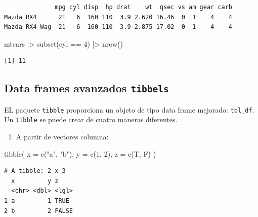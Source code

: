 \documentclass[
  letterpaper,
  DIV=11,
  numbers=noendperiod]{scrreprt}
\newenvironment{Shaded}{\begin{snugshade}}{\end{snugshade}}
\newcommand{\AttributeTok}[1]{\textcolor[rgb]{0.40,0.45,0.13}{#1}}
\newcommand{\DecValTok}[1]{\textcolor[rgb]{0.68,0.00,0.00}{#1}}
\newcommand{\FunctionTok}[1]{\textcolor[rgb]{0.28,0.35,0.67}{#1}}
\newcommand{\NormalTok}[1]{\textcolor[rgb]{0.00,0.23,0.31}{#1}}
\newcommand{\SpecialCharTok}[1]{\textcolor[rgb]{0.37,0.37,0.37}{#1}}
\newcommand{\StringTok}[1]{\textcolor[rgb]{0.13,0.47,0.30}{#1}}
\providecommand{\tightlist}{%
  \setlength{\itemsep}{0pt}\setlength{\parskip}{0pt}}\usepackage{longtable,booktabs,array}
\begin{document}
\begin{verbatim}
              mpg cyl disp  hp drat    wt  qsec vs am gear carb
Mazda RX4      21   6  160 110  3.9 2.620 16.46  0  1    4    4
Mazda RX4 Wag  21   6  160 110  3.9 2.875 17.02  0  1    4    4
\end{verbatim}

\begin{Shaded}
\begin{Highlighting}[]
\NormalTok{mtcars }\SpecialCharTok{|\textgreater{}} \FunctionTok{subset}\NormalTok{(cyl }\SpecialCharTok{==} \DecValTok{4}\NormalTok{) }\SpecialCharTok{|\textgreater{}} \FunctionTok{nrow}\NormalTok{()  }
\end{Highlighting}
\end{Shaded}

\begin{verbatim}
[1] 11
\end{verbatim}

\subsection{\texorpdfstring{Data frames avanzados
\texttt{tibbels}}{Data frames avanzados tibbels}}\label{data-frames-avanzados-tibbels}

EL paquete \texttt{tibble} proporciona un objeto de tipo data frame
mejorado: \texttt{tbl\_df}. Un \texttt{tibble} se puede crear de cuatro
maneras diferentes.

\begin{enumerate}
\def\labelenumi{\alph{enumi}.}
\tightlist
\item
  A partir de vectores columna:
\end{enumerate}

\begin{Shaded}
\begin{Highlighting}[]
\FunctionTok{tibble}\NormalTok{(}
  \AttributeTok{x =} \FunctionTok{c}\NormalTok{(}\StringTok{"a"}\NormalTok{, }\StringTok{"b"}\NormalTok{),}
  \AttributeTok{y =} \FunctionTok{c}\NormalTok{(}\DecValTok{1}\NormalTok{, }\DecValTok{2}\NormalTok{),}
  \AttributeTok{z =} \FunctionTok{c}\NormalTok{(T, F)}
\NormalTok{)}
\end{Highlighting}
\end{Shaded}

\begin{verbatim}
# A tibble: 2 x 3
  x         y z    
  <chr> <dbl> <lgl>
1 a         1 TRUE 
2 b         2 FALSE
\end{verbatim}
\end{document}
